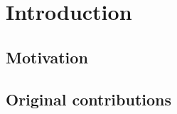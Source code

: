 \chapter{Introduction}
\label{chapter:introduction}

\section{Motivation}
\label{section:motivation}




\section{Original contributions}
\label{section:originalContributions}











